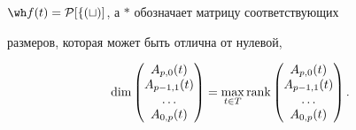 \begin{lem}
$\wh f(t)=\cal P [f(t)]$, а $\ast$ обозначает матрицу соответствующих


размеров, которая может быть отлична от нулевой,


\begin{equation}


\dim


\begin{pmatrix}


A_{p,0}(t) \\ A_{p-1,1}(t) \\ \dotsc \\ A_{0,p}(t)


\end{pmatrix} = \max_{t \in T} \rank


\begin{pmatrix}


A_{p,0}(t) \\ A_{p-1,1}(t) \\ \dotsc \\ A_{0,p}(t)


\end{pmatrix}


.


\end{equation}


\end{lem}






